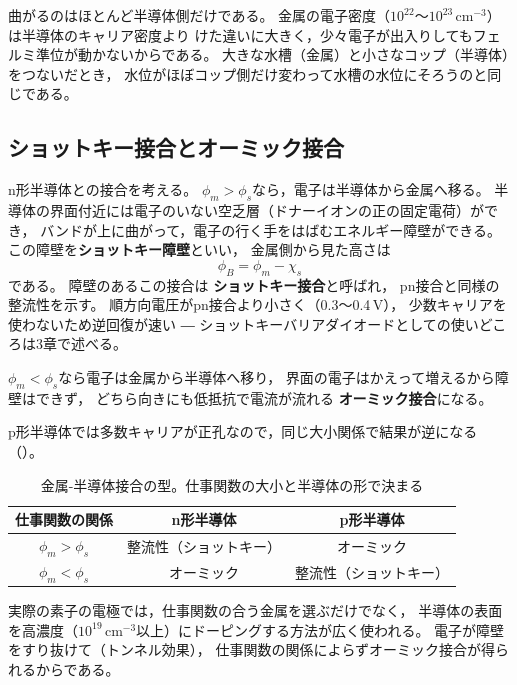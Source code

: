 曲がるのはほとんど半導体側だけである。
金属の電子密度（$10^{22}$〜$10^{23}\,\mathrm{cm^{-3}}$）は半導体のキャリア密度より
けた違いに大きく，少々電子が出入りしてもフェルミ準位が動かないからである。
大きな水槽（金属）と小さなコップ（半導体）をつないだとき，
水位がほぼコップ側だけ変わって水槽の水位にそろうのと同じである。

\subsection{ショットキー接合とオーミック接合}

n形半導体との接合を考える。
$\phi_m > \phi_s$なら，電子は半導体から金属へ移る。
半導体の界面付近には電子のいない空乏層（ドナーイオンの正の固定電荷）ができ，
バンドが上に曲がって，電子の行く手をはばむエネルギー障壁ができる。
この障壁を\textbf{ショットキー障壁}といい，
金属側から見た高さは
\begin{equation}
\phi_B = \phi_m - \chi_s
\label{eq1.12}
\end{equation}
である。
障壁のあるこの接合は
\textbf{ショットキー接合}と呼ばれ，
pn接合と同様の整流性を示す。
順方向電圧がpn接合より小さく（0.3〜0.4\,V），
少数キャリアを使わないため逆回復が速い ―
ショットキーバリアダイオードとしての使いどころは3章で述べる。

$\phi_m < \phi_s$なら電子は金属から半導体へ移り，
界面の電子はかえって増えるから障壁はできず，
どちら向きにも低抵抗で電流が流れる
\textbf{オーミック接合}になる。

p形半導体では多数キャリアが正孔なので，同じ大小関係で結果が逆になる
（）。

\begin{table}[ht]
\begin{center}
\caption{金属-半導体接合の型。仕事関数の大小と半導体の形で決まる}
\label{tab1.1}
\begin{tabular}{c|c|c}
\hline
仕事関数の関係 & n形半導体 & p形半導体 \\
\hline
$\phi_m > \phi_s$ & 整流性（ショットキー） & オーミック \\
$\phi_m < \phi_s$ & オーミック & 整流性（ショットキー） \\
\hline
\end{tabular}
\end{center}
\end{table}

実際の素子の電極では，仕事関数の合う金属を選ぶだけでなく，
半導体の表面を高濃度（$10^{19}\,\mathrm{cm^{-3}}$以上）にドーピングする方法が広く使われる。
電子が障壁をすり抜けて（トンネル効果），
仕事関数の関係によらずオーミック接合が得られるからである。

